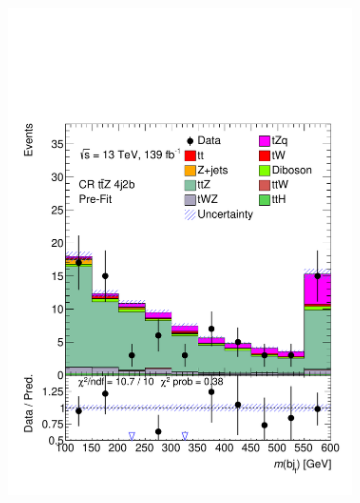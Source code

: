 \begin{figure}[!h]
\begin{subfigure}[b]{0.33\linewidth}
    \includegraphics[width=\textwidth]{ubonn-thesis/Chapters/Chapters_08/appendix/data/CR_4j2b.pdf} 
  \end{subfigure} 
  \begin{subfigure}[b]{0.33\linewidth}
    \centering

\end{subfigure}
\end{figure}
